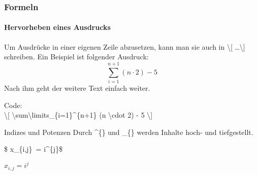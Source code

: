 \begin{frame}
\frametitle{Formeln}
\framesubtitle{Hervorheben eines Ausdrucks}



Um Ausdrücke in einer eigenen Zeile abzusetzen, kann man sie auch in {\ttfamily\color{unibayellowI}\textbackslash [\color{nounibaredI} \ldots \color{unibayellowI}\textbackslash ]} schreiben. 
Ein Beispiel ist folgender Ausdruck:
\[ \sum\limits_{i=1}^{n+1} (n \cdot 2) - 5 \]
Nach ihm geht der weitere Text einfach weiter.

\bigskip

Code:\\
{\ttfamily \color{unibayellowI}\textbackslash [	\color{nounibaredI}\textbackslash\color{nounibaredI}sum\textbackslash  limits\_\color{black}\{i=1\}\color{nounibaredI}\^{}\color{black}\{n+1\} (n \color{nounibaredI}\textbackslash \color{nounibaredI}cdot \color{black}2) - 5 \color{unibayellowI}\textbackslash ]}

\medskip

\begin{block}{Indizes und Potenzen}
Durch {\ttfamily \color{nounibaredI}\^{}\color{black}\{\} und \color{nounibaredI}\_\color{black}\{\} } werden Inhalte hoch- und tiefgestellt.

\begin{center}
{\ttfamily \color{unibayellowI}\$%
\color{black}x\color{nounibaredI}\_\color{black}\{i,j\}\color{black}~= i\color{nounibaredI}\^{}\color{black}\{j\}\color{unibayellowI}\$}

\medskip
 
$x_{i,j} = i^{j}$
\end{center}

\vspace{-2mm}

\end{block}
\vspace{-5mm}

\end{frame}






